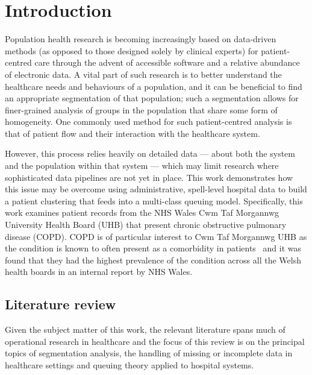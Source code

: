 \section{Introduction}\label{sec:intro}

Population health research is becoming increasingly based on data-driven methods
(as opposed to those designed solely by clinical experts) for patient-centred
care through the advent of accessible software and a relative abundance of
electronic data. A vital part of such research is to better understand the
healthcare needs and behaviours of a population, and it can be beneficial to
find an appropriate segmentation of that population; such a segmentation allows
for finer-grained analysis of groups in the population that share some form of
homogeneity. One commonly used method for such patient-centred analysis is that
of patient flow and their interaction with the healthcare system.

However, this process relies heavily on detailed data --- about both the system
and the population within that system --- which may limit research where
sophisticated data pipelines are not yet in place. This work demonstrates how
this issue may be overcome using administrative, spell-level hospital data to
build a patient clustering that feeds into a multi-class queuing model.
Specifically, this work examines patient records from the NHS Wales Cwm Taf
Morgannwg University Health Board (UHB) that present chronic obstructive
pulmonary disease (COPD). COPD is of particular interest to Cwm Taf Morgannwg
UHB as the condition is known to often present as a comorbidity in
patients~\cite{Houben2019} and it was found that they had the highest prevalence
of the condition across all the Welsh health boards in an internal report by NHS
Wales.



\subsection{Literature review}\label{subsec:review}

Given the subject matter of this work, the relevant literature spans much of
operational research in healthcare and the focus of this review is on the
principal topics of segmentation analysis, the handling of missing or incomplete
data in healthcare settings and queuing theory applied to hospital systems.

